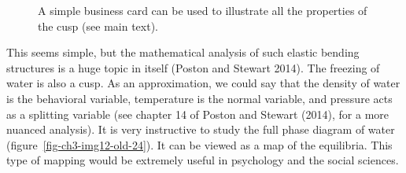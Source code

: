 \documentclass[
  a4paper,
  DIV=11,
  numbers=noendperiod,
  oneside]{scrreprt}
\begin{document}
\begin{figure}


\caption{\label{fig-ch3-img11-old-23}A simple business card can be used
to illustrate all the properties of the cusp (see main text).}

\end{figure}%

This seems simple, but the mathematical analysis of such elastic bending
structures is a huge topic in itself (Poston and Stewart 2014). The
freezing of water is also a cusp. As an approximation, we could say that
the density of water is the behavioral variable, temperature is the
normal variable, and pressure acts as a splitting variable (see chapter
14 of Poston and Stewart (2014), for a more nuanced analysis). It is
very instructive to study the full phase diagram of water
(figure~\ref{fig-ch3-img12-old-24}). It can be viewed as a map of the
equilibria. This type of mapping would be extremely useful in psychology
and the social sciences.
\end{document}
